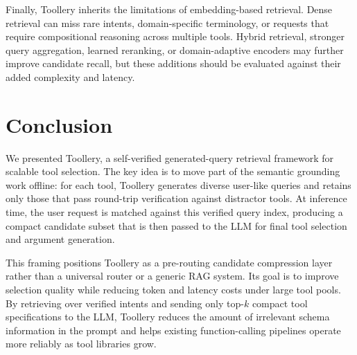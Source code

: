 \documentclass[11pt]{article}
\begin{document}
Finally, Toollery inherits the limitations of embedding-based retrieval. Dense retrieval can miss rare intents, domain-specific terminology, or requests that require compositional reasoning across multiple tools. Hybrid retrieval, stronger query aggregation, learned reranking, or domain-adaptive encoders may further improve candidate recall, but these additions should be evaluated against their added complexity and latency.

\section{Conclusion}
\label{sec:conclusion_draft}

We presented Toollery, a self-verified generated-query retrieval framework for scalable tool selection. The key idea is to move part of the semantic grounding work offline: for each tool, Toollery generates diverse user-like queries and retains only those that pass round-trip verification against distractor tools. At inference time, the user request is matched against this verified query index, producing a compact candidate subset that is then passed to the LLM for final tool selection and argument generation.

This framing positions Toollery as a pre-routing candidate compression layer rather than a universal router or a generic RAG system. Its goal is to improve selection quality while reducing token and latency costs under large tool pools. By retrieving over verified intents and sending only top-$k$ compact tool specifications to the LLM, Toollery reduces the amount of irrelevant schema information in the prompt and helps existing function-calling pipelines operate more reliably as tool libraries grow.
\clearpage
\newpage

\end{document}

